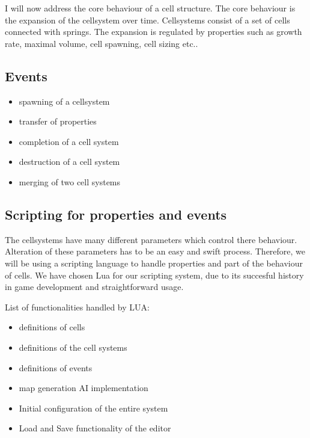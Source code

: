 \documentclass{article}
\begin{document}
I will now address the core behaviour of a cell structure. The core behaviour is the expansion of the cellsystem over time. Cellsystems consist of a set of cells connected with springs. The expansion is regulated by properties such as growth rate, maximal volume, cell spawning, cell sizing etc..    

\subsection{Events}

\begin{itemize}
\item spawning of a cellsystem
\item transfer of properties
\item completion of a cell system
\item destruction of a cell system
\item merging of two cell systems
\end{itemize}


\subsection{Scripting for properties and events}

The cellsystems have many different parameters which control there behaviour. Alteration of these parameters has to be an easy and swift process. Therefore, we will be using a scripting language to handle properties and part of the behaviour of cells. We have chosen Lua for our scripting system, due to its succesful history in game development and straightforward usage.

List of functionalities handled by LUA: 

\begin{itemize}
\item definitions of cells  
\item definitions of the cell systems
\item definitions of events
\item map generation AI implementation
\item Initial configuration of the entire system 
\item Load and Save functionality of the editor   
\end{itemize}




\end{document}
